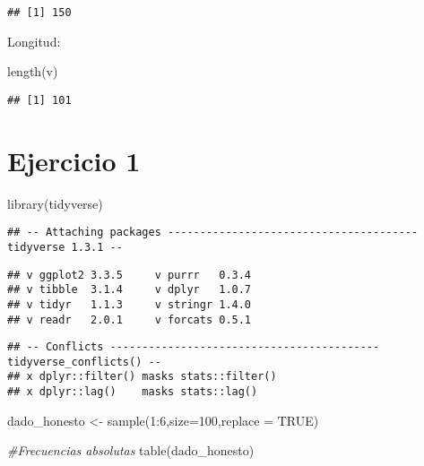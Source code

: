 \documentclass[
]{article}
\newenvironment{Shaded}{\begin{snugshade}}{\end{snugshade}}
\newcommand{\AttributeTok}[1]{\textcolor[rgb]{0.77,0.63,0.00}{#1}}
\newcommand{\CommentTok}[1]{\textcolor[rgb]{0.56,0.35,0.01}{\textit{#1}}}
\newcommand{\ConstantTok}[1]{\textcolor[rgb]{0.00,0.00,0.00}{#1}}
\newcommand{\DecValTok}[1]{\textcolor[rgb]{0.00,0.00,0.81}{#1}}
\newcommand{\FunctionTok}[1]{\textcolor[rgb]{0.00,0.00,0.00}{#1}}
\newcommand{\NormalTok}[1]{#1}
\newcommand{\OtherTok}[1]{\textcolor[rgb]{0.56,0.35,0.01}{#1}}
\newcommand{\SpecialCharTok}[1]{\textcolor[rgb]{0.00,0.00,0.00}{#1}}
\begin{document}
\begin{verbatim}
## [1] 150
\end{verbatim}

Longitud:

\begin{Shaded}
\begin{Highlighting}[]
\FunctionTok{length}\NormalTok{(v)}
\end{Highlighting}
\end{Shaded}

\begin{verbatim}
## [1] 101
\end{verbatim}

\hypertarget{ejercicio-1}{%
\section{Ejercicio 1}\label{ejercicio-1}}

\begin{Shaded}
\begin{Highlighting}[]
\FunctionTok{library}\NormalTok{(tidyverse)}
\end{Highlighting}
\end{Shaded}

\begin{verbatim}
## -- Attaching packages --------------------------------------- tidyverse 1.3.1 --
\end{verbatim}

\begin{verbatim}
## v ggplot2 3.3.5     v purrr   0.3.4
## v tibble  3.1.4     v dplyr   1.0.7
## v tidyr   1.1.3     v stringr 1.4.0
## v readr   2.0.1     v forcats 0.5.1
\end{verbatim}

\begin{verbatim}
## -- Conflicts ------------------------------------------ tidyverse_conflicts() --
## x dplyr::filter() masks stats::filter()
## x dplyr::lag()    masks stats::lag()
\end{verbatim}

\begin{Shaded}
\begin{Highlighting}[]
\NormalTok{dado\_honesto }\OtherTok{\textless{}{-}} \FunctionTok{sample}\NormalTok{(}\DecValTok{1}\SpecialCharTok{:}\DecValTok{6}\NormalTok{,}\AttributeTok{size=}\DecValTok{100}\NormalTok{,}\AttributeTok{replace =} \ConstantTok{TRUE}\NormalTok{)}

\CommentTok{\#Frecuencias absolutas}
\FunctionTok{table}\NormalTok{(dado\_honesto)}
\end{Highlighting}
\end{Shaded}
\end{document}
